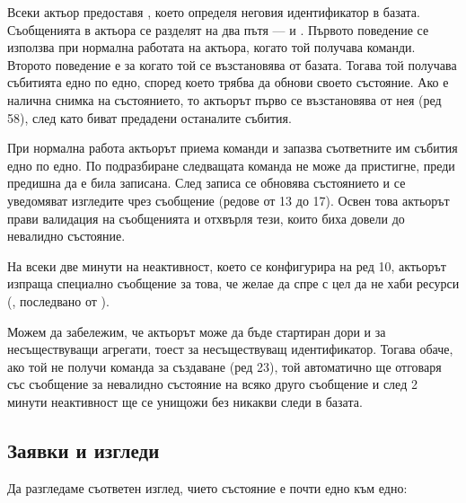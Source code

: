 Всеки актьор предоставя , което определя неговия идентификатор в базата. Съобщенията в актьора се разделят на два пътя —  и . Първото поведение се използва при нормална работата на актьора, когато той получава команди. Второто поведение е за когато той се възстановява от базата. Тогава той получава събитията едно по едно, според което трябва да обнови своето състояние. Ако е налична снимка на състоянието, то актьорът първо се възстановява от нея (ред 58), след като биват предадени останалите събития.

При нормална работа актьорът приема команди и запазва съответните им събития едно по едно. По подразбиране следващата команда не може да пристигне, преди предишна да е била записана. След записа се обновява състоянието и се уведомяват изгледите чрез  съобщение (редове от 13 до 17). Освен това актьорът прави валидация на съобщенията и отхвърля тези, които биха довели до невалидно състояние.

На всеки две минути на неактивност, което се конфигурира на ред 10, актьорът изпраща специално съобщение за това, че желае да спре с цел да не хаби ресурси (, последвано от ).

Можем да забележим, че актьорът може да бъде стартиран дори и за несъществуващи агрегати, тоест за несъществуващ идентификатор. Тогава обаче, ако той не получи команда за създаване (ред 23), той автоматично ще отговаря със съобщение за невалидно състояние на всяко друго съобщение и след 2 минути неактивност ще се унищожи без никакви следи в базата.

\subsection{Заявки и изгледи}

Да разгледаме съответен изглед, чието състояние е почти едно към едно:

